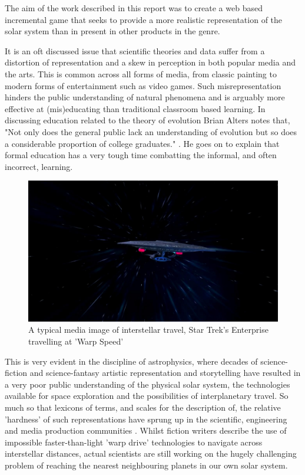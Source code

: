 \documentclass[twoside]{bhamthesis}
\begin{document}
The aim of the work described in this report was to create a web based incremental game that seeks to provide a more realistic representation of the solar system than in present in other products in the genre.

It is an oft discussed issue that scientific theories and data suffer from a distortion of representation and a skew in perception in both popular media and the arts. This is common across all forms of media, from classic painting to modern forms of entertainment such as video games. Such misrepresentation hinders the public understanding of natural phenomena and is arguably more effective at (mis)educating than traditional classroom based learning. In discussing education related to the theory of evolution Brian Alters notes that, "Not only does the general public lack an understanding of evolution but so does a considerable proportion of college graduates." \cite{alters_perspective:_2002}. He goes on to explain that formal education has a very tough time combatting the informal, and often incorrect, learning.

\begin{figure}[h!]
  \includegraphics[width=\linewidth]{images/star_trek_warp.jpg}
  \caption{A typical media image of interstellar travel, Star Trek's Enterprise travelling at 'Warp Speed' {\cite{_gamescom_2011}}}
  \label{fig:star_trek}
\end{figure}


This is very evident in the discipline of astrophysics, where decades of science-fiction and science-fantasy artistic representation and storytelling have resulted in a very poor public understanding of the physical solar system, the technologies available for space exploration and the possibilities of interplanetary travel. So much so that lexicons of terms, and scales for the description of, the relative 'hardness' of such representations have sprung up in the scientific, engineering and media production communities \cite{_mohs_????}. Whilst fiction writers describe the use of impossible faster-than-light 'warp drive' technologies to navigate across interstellar distances, actual scientists are still working on the hugely challenging problem of reaching the nearest neighbouring planets in our own solar system.
\end{document}
